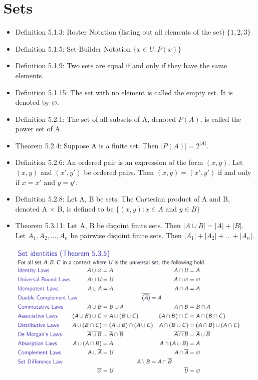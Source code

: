\documentclass{article}
\begin{document}
\section*{Sets}
\begin{itemize}
    \item Definition 5.1.3: Roster Notation (listing out all elements of the set) $\{1,2,3\}$
    \item Definition 5.1.5: Set-Builder Notation $\{x\in U: P(x)\}$
    \item Definition 5.1.9: Two sets are equal if and only if they have the same elements.
    \item Definition 5.1.15: The set with no element is called the empty est. It is denoted by $\varnothing$.
    \item Definition 5.2.1: The set of all subsets of A, denoted $P(A)$, is called the power set of A.
    \item Theorem 5.2.4: Suppose A is a finite set. Then $|P(A)| = 2^{|A|}$.
    \item Definition 5.2.6: An ordered pair is an expression of the form $(x,y)$. Let $(x,y)$ and $(x',y')$ be ordered pairs. Then $(x,y)=(x',y')$ if and only if $x=x'$ and $y=y'$.
    \item Definition 5.2.8: Let A, B be sets. The Cartesian product of A and B, denoted A $\times$ B, is defined to be $\{(x,y):x\in A$ and $y\in B\}$
    \item Theorem 5.3.11: Let A, B be disjoint finite sets. Then $|A\cup B|=|A|+|B|$. 
       \\ Let $A_1, A_2,...,A_n$ be pairwise disjoint finite sets. Then $|A_1|+|A_2|+...+|A_n|$.

    \begin{center}
        \includegraphics[width=12cm]{images/setidentities.png}
    \end{center}


\end{itemize}
\end{document}
